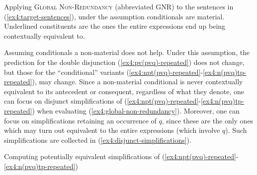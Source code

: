 \begin{exe}
	\ex Applying \textsc{Global Non-Redundancy} (abbreviated GNR) to the sentences in (\ref{ex4:target-sentences}), under the assumption conditionals are material. Underlined constituents are the ones the entire expressions end up being contextually equivalent to. \label{ex4:gnr-material}
	\begin{xlist}
		\label{ex4:pv(pvq)-gnr-material}
		\label{ex4:npt(pvq)-gnr-material}
		\label{ex4:pv(nptq)-gnr-material}
		\label{ex4:pv(nqtp)-gnr-material}
		\label{ex4:n(pvq)tp-gnr-material}
	\end{xlist}
\end{exe}

Assuming conditionals a non-material does not help. Under this assumption, the prediction for the double disjunction (\ref{ex4:pv(pvq)-repeated}) does not change, but those for the ``conditional'' variants (\ref{ex4:npt(pvq)-repeated}-\ref{ex4:n(pvq)tp-repeated}), may change. Since a non-material conditional is never contextually equivalent to its antecedent or consequent, regardless of what they denote, one can focus on disjunct simplifications of (\ref{ex4:npt(pvq)-repeated}-\ref{ex4:n(pvq)tp-repeated}) when evaluating (\ref{ex4:global-non-redundancy}). Moreover, one can focus on simplifications retaining an occurrence of $q$, since these are the only ones which may turn out equivalent to the entire expressions (which involve $q$). Such simplifications are collected in (\ref{ex4:disjunct-simplifications}).

\begin{exe}
	\ex Computing potentially equivalent simplifications of (\ref{ex4:npt(pvq)-repeated}-\ref{ex4:n(pvq)tp-repeated}) \label{ex4:disjunct-simplifications}
	\begin{xlist}
		\ex {(\ref{ex4:npt(pvq)-repeated}): $\neg \p \rightarrow (\cancel{\p \vee} \q)= \neg \p \rightarrow \q$}\label{ex4:npt(pvq)-simp}
		\ex {(\ref{ex4:pv(nptq)-repeated}): $\cancel{\p \vee} (\neg \p \rightarrow \q) = \neg \p \rightarrow \q$}\label{ex4:pv(nptq)-simp}
		\ex {(\ref{ex4:pv(nqtp)-repeated}): $\cancel{\p \vee} (\neg \q \rightarrow \p) = \neg \q \rightarrow \p$}\label{ex4:pv(nqtp)-simp}
		\ex {(\ref{ex4:n(pvq)tp-repeated}): $\neg(\cancel{\p \vee} \q) \rightarrow \p = \neg \q \rightarrow \p$}\label{ex4:n(pvq)tp-simp}
	\end{xlist}
\end{exe}


